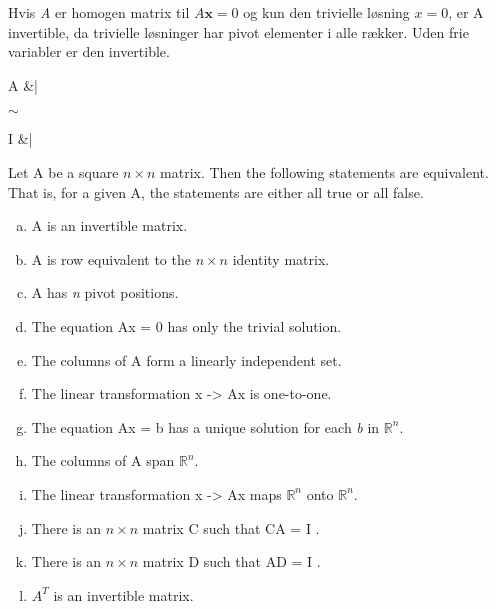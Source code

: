 \documentclass[danish, english]{article}
\begin{document}
\begin{theo}[Homogen] 
Hvis \textit{A} er homogen matrix til $A\textbf{x}=0$ og kun den trivielle løsning $x=0$, er A invertible, da trivielle løsninger har pivot elementer i alle rækker. 
Uden frie variabler er den invertible.
\\
\begin{ArgMat}
A &| 
\end{ArgMat}$\sim$
\begin{ArgMat}
I &| 
\end{ArgMat}
\end{theo}



\begin{theo} 
Let A be a square $n \times n$ matrix. Then the following statements are equivalent.
That is, for a given A, the statements are either all true or all false.
\begin{enumerate}[a)]
\item A is an invertible matrix.
\item  A is row equivalent to the $n \times n$ identity matrix.
\item  A has \textit{n} pivot positions.
\item  The equation Ax = 0 has only the trivial solution.
\item The columns of A form a linearly independent set.
\item  The linear transformation x -> Ax is one-to-one.
\item  The equation Ax = b has a unique solution for each \textit{b} in $\mathbb{R}^n$.
\item  The columns of A span $\mathbb{R}^n$.
\item  The linear transformation x -> Ax maps $\mathbb{R}^n$ onto $\mathbb{R}^n$.
\item  There is an $n \times n$ matrix C such that CA = I .
\item  There is an $n \times n$ matrix D such that AD = I .
\item  $A^T$ is an invertible matrix.
\end{enumerate}
\end{theo}
\end{document}

